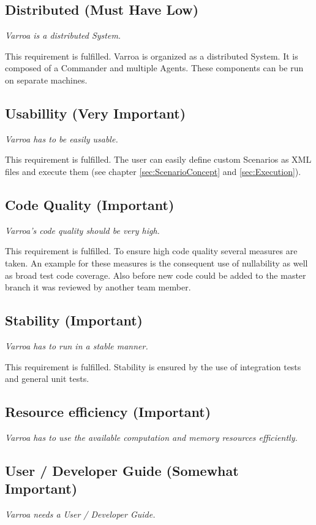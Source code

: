 \subsection{Distributed (Must Have Low)} 
\emph{Varroa is a distributed System.}

This requirement is fulfilled.
Varroa is organized as a distributed System.
It is composed of a Commander and multiple Agents.
These components can be run on separate machines. 
 
\subsection{Usabillity (Very Important)} 
\emph{Varroa has to be easily usable.}

This requirement is fulfilled.
The user can easily define custom Scenarios as XML files and execute them (see chapter \ref{sec:ScenarioConcept} and \ref{sec:Execution}).

\subsection{Code Quality (Important)} 
\emph{Varroa's code quality should be very high.}

This requirement is fulfilled.
To ensure high code quality several measures are taken.
An example for these measures is the consequent use of nullability as well as broad test code coverage. 
Also before new code could be added to the master branch it was reviewed by another team member.

\subsection{Stability (Important)} 
\emph{Varroa has to run in a stable manner.}

This requirement is fulfilled.
Stability is ensured by the use of integration tests and general unit tests.

\subsection{Resource efficiency (Important)} 
\emph{Varroa has to use the available computation and memory resources efficiently.}

\subsection{User / Developer Guide (Somewhat Important)} 
\emph{Varroa needs a User / Developer Guide.}

